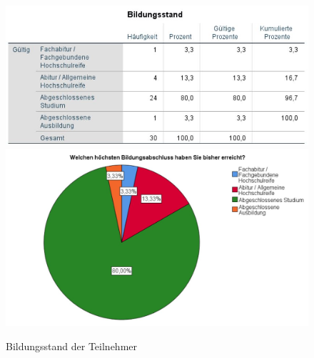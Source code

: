 \documentclass[a4paper,11pt]{article}%
\renewcommand{\\}{\vspace*{0.5\baselineskip} \newline}
\begin{document}
	\begin{figure}[H]
		\begin{footnotesize}
			\includegraphics[width=\textwidth]{Abbildungen/Pre_QuestionnaireStatistiks/teilnehmerBildungsstand}\\
			\includegraphics[width=\textwidth]{Abbildungen/Demographie/teilnehmerBildungsstand}\\
			\caption{Bildungsstand der Teilnehmer}
			\label{fig:teilnehmerBildungsstand}
		\end{footnotesize}
	\end{figure}	
	
\end{document}
